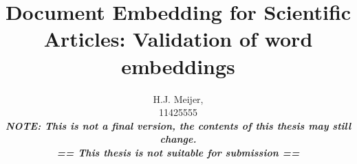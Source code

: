 \documentclass[10pt,a4paper]{article}
\begin{document}
\begin{titlepage}
\title{Document Embedding for Scientific Articles: Validation of word embeddings}
\author{H.J. Meijer,\\11425555\\\textit{\textbf{NOTE: This is not a final version, the contents of this thesis may still change.}}\\ \textit{\textbf{== This thesis is not suitable for submission ==}}}
\clearpage\maketitle\thispagestyle{empty}

\end{titlepage}
\tableofcontents
\clearpage

\clearpage

\clearpage

\clearpage

\clearpage

\clearpage

\clearpage

\clearpage



\end{document}
